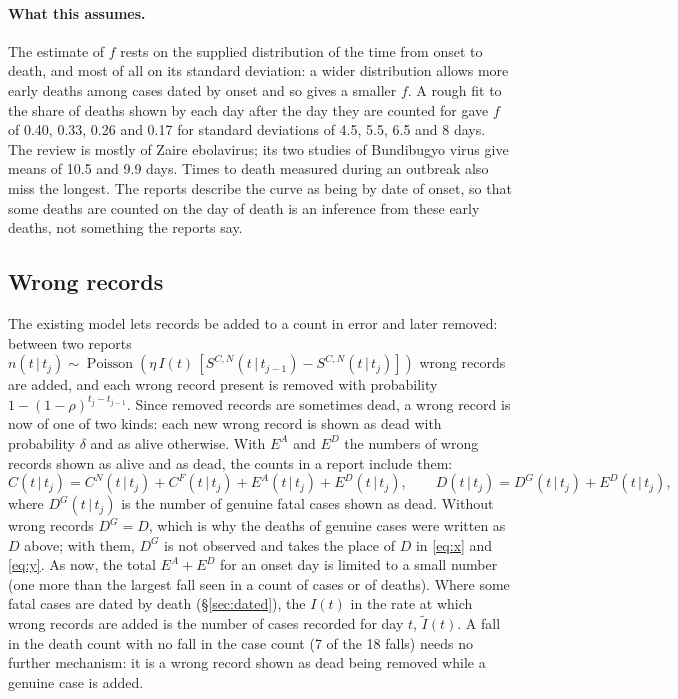 \documentclass[11pt,a4paper]{article}
\newcommand{\given}{\,|\,}
\newcommand{\pois}{\operatorname{Poisson}}
\begin{document}
\paragraph{What this assumes.} The estimate of $f$ rests on the supplied
distribution of the time from onset to death, and most of all on its
standard deviation: a wider distribution allows more early deaths among
cases dated by onset and so gives a smaller $f$. A rough fit to the share of
deaths shown by each day after the day they are counted for gave $f$ of 0.40,
0.33, 0.26 and 0.17 for standard deviations of 4.5, 5.5, 6.5 and 8 days.
The review is mostly of Zaire ebolavirus; its two studies of Bundibugyo
virus give means of 10.5 and 9.9 days. Times to death measured during an
outbreak also miss the longest. The reports describe the curve as being by
date of onset, so that some deaths are counted on the day of death is an
inference from these early deaths, not something the reports say.

\subsection{Wrong records}\label{sec:wrong}

The existing model lets records be added to a count in error and later
removed: between two reports $n(t\given t_j)\sim\pois(\eta\,I(t)\,
[S^{C,N}(t\given t_{j-1})-S^{C,N}(t\given t_j)])$ wrong records are
added, and each wrong record present is removed with probability
$1-(1-\rho)^{t_j-t_{j-1}}$. Since removed records are sometimes dead, a wrong
record is now of one of two kinds: each new wrong record is shown as dead
with probability $\delta$ and as alive otherwise. With $E^{A}$ and $E^{D}$
the numbers of wrong records shown as alive and as dead, the counts in a
report include them:
\[
C(t\given t_j)=C^{N}(t\given t_j)+C^{F}(t\given t_j)+E^{A}(t\given t_j)+E^{D}(t\given t_j),
\qquad
D(t\given t_j)=D^{G}(t\given t_j)+E^{D}(t\given t_j),
\]
where $D^{G}(t\given t_j)$ is the number of genuine fatal cases shown as
dead. Without wrong records $D^{G}=D$, which is why the deaths of genuine
cases were written as $D$ above; with them, $D^{G}$ is not observed and
takes the place of $D$ in \eqref{eq:x} and \eqref{eq:y}.
As now, the total $E^{A}+E^{D}$ for an onset day is limited to a small
number (one more than the largest fall seen in a count of cases or of
deaths). Where some fatal cases are dated by death (\S\ref{sec:dated}), the
$I(t)$ in the rate at which wrong records are added is the number of cases
recorded for day $t$, $\tilde{I}(t)$. A fall in the death
count with no fall in the case count (7 of the 18 falls) needs no further
mechanism: it is a wrong record shown as dead being removed while a genuine
case is added.
\end{document}
